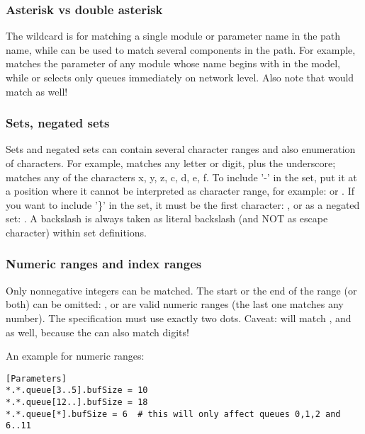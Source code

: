 \subsubsection{Asterisk vs double asterisk}

The \ttt{*} wildcard is for matching a single module or parameter name in the
path name, while \ttt{**} can be used to match several components in the path.
For example,  matches the  parameter of any module
whose name begins with  in the model, while 
or  selects only queues immediately on network level.
Also note that  would match 
as well!

\subsubsection{Sets, negated sets}

Sets and negated sets can contain several character ranges and also
enumeration of characters. For example,  matches any letter
or digit, plus the underscore;  matches any of the characters
x, y, z, c, d, e, f.
To include '-' in the set, put it at a position where it cannot be
interpreted as character range, for example:  or .
If you want to include '\}' in the set, it must be the first
character: , or as a negated set: . A backslash
is always taken as literal backslash (and NOT as escape character)
within set definitions.


\subsubsection{Numeric ranges and index ranges}

Only nonnegative integers can be matched.  The start or the end of the range
(or both) can be omitted: ,  or 
are valid numeric ranges (the last one matches any number).
The specification must use exactly two dots.
Caveat:  will match ,  and  as well,
because the \ttt{*} can also match digits!

An example for numeric ranges:

\begin{verbatim}
[Parameters]
*.*.queue[3..5].bufSize = 10
*.*.queue[12..].bufSize = 18
*.*.queue[*].bufSize = 6  # this will only affect queues 0,1,2 and 6..11
\end{verbatim}

